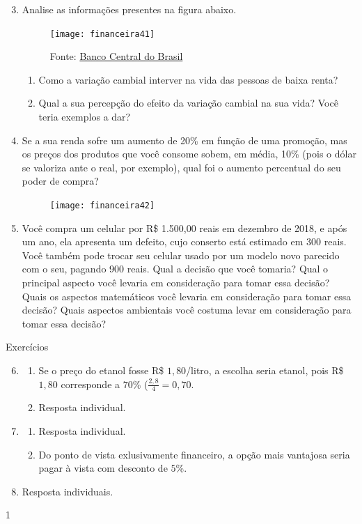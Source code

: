 \begin{enumerate}
\setcounter{enumi}{2}
\item Analise as informações presentes na figura abaixo.
\begin{figure}[H]
\centering

\texttt{[image: financeira41]}
\caption{Fonte: \href{https://www.bcb.gov.br/}{Banco Central do Brasil}}
\end{figure}
  \begin{enumerate}
    \item Como a variação cambial interver na vida das pessoas de baixa renta?
    \item Qual a sua percepção do efeito da variação cambial na sua vida? Você teria exemplos a dar?
  \end{enumerate}

\item Se a sua renda sofre um aumento de 20\% em função de uma promoção, mas os preços dos produtos que você consome sobem, em média, 10\% (pois o dólar se valoriza ante o real, por exemplo), qual foi o aumento percentual do seu poder de compra?

\begin{figure}[H]
\centering

\texttt{[image: financeira42]}
\end{figure}

\item Você compra um celular por R\$ 1.500,00 reais em dezembro de 2018, e após um ano, ela apresenta um defeito, cujo conserto está estimado em 300 reais. Você também pode trocar seu celular usado por um modelo novo parecido com o seu, pagando 900 reais. Qual a decisão que você tomaria? Qual o principal aspecto você levaria em consideração para tomar essa decisão? Quais os aspectos matemáticos você levaria em consideração para tomar essa decisão? Quais aspectos ambientais você costuma levar em consideração para tomar essa decisão?
\end{enumerate}
\clearpage
\begin{resposta}{Exercícios}
{\begin{enumerate}\setcounter{enumi}{5}
  \item
  \begin{enumerate}
    \item Se o preço do etanol fosse R\$ $1{,}80$/litro, a escolha seria etanol, pois R\$ $1{,}80$ corresponde a $70$\% ($\displaystyle\frac{2{,}8}{4}=0{,}70$.
    \item Resposta individual.
  \end{enumerate}
  \item 
  \begin{enumerate}
    \item Resposta individual.
    \item Do ponto de vista exlusivamente financeiro, a opção mais vantajosa seria pagar à vista com desconto de $5$\%.
  \end{enumerate}
  \setcounter{enumi}{8}
  \item Resposta individuais.

\end{enumerate}
}{1}
\end{resposta}

